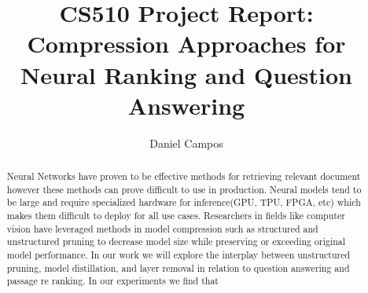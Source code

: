 \documentclass[sigplan,screen]{acmart}
\begin{document}
\title{CS510 Project Report: Compression Approaches for Neural Ranking and Question Answering}
\author{Daniel Campos}
\begin{abstract}
Neural Networks have proven to be effective methods for retrieving relevant document however these methods can prove difficult to use in production. Neural models tend to be large and require specialized hardware for inference(GPU, TPU, FPGA, etc) which makes them difficult to deploy for all use cases. Researchers in fields like computer vision have leveraged methods in model compression such as structured and unstructured pruning to decrease model size while preserving or exceeding original model performance. In our work we will explore the interplay between unstructured pruning, model distillation, and layer removal in relation to question answering and passage re ranking. In our experiments we find that     
\end{abstract}
\maketitle








\end{document}
